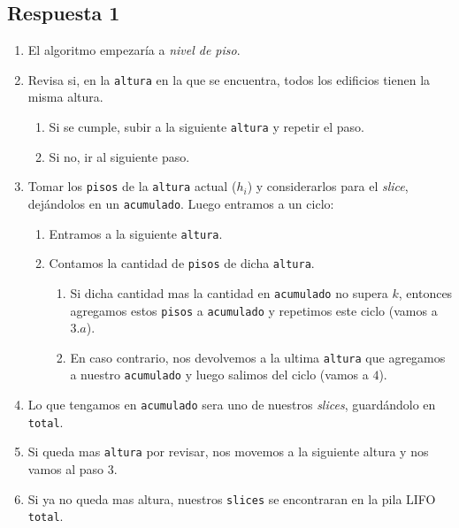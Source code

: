 \documentclass[spanish, fleqn]{article}
\begin{document}
\subsection{Respuesta 1}

\begin{enumerate}
    \item El algoritmo empezaría a \textit{nivel de piso}.
    
    \item Revisa si, en la \texttt{altura} en la que se encuentra, todos los edificios tienen la misma altura.
    
    \begin{enumerate}
        \item Si se cumple, subir a la siguiente \texttt{altura} y repetir el paso.
        
        \item Si no, ir al siguiente paso.
    \end{enumerate}
    
    \item Tomar los \texttt{pisos} de la \texttt{altura} actual (\texttt{$h_i$}) y considerarlos para el \textit{slice}, dejándolos en un \texttt{acumulado}. Luego entramos a un ciclo:
    
    \begin{enumerate}
        \item Entramos a la siguiente \texttt{altura}.
        
        \item Contamos la cantidad de \texttt{pisos} de dicha \texttt{altura}.
        
        \begin{enumerate}
            \item Si dicha cantidad mas la cantidad en \texttt{acumulado} no supera \texttt{$k$}, entonces agregamos estos \texttt{pisos} a \texttt{acumulado} y repetimos este ciclo (vamos a $3.a$).
            
            \item En caso contrario, nos devolvemos a la ultima \texttt{altura} que agregamos a nuestro \texttt{acumulado} y luego salimos del ciclo (vamos a $4$).
        \end{enumerate}
        
    \end{enumerate}
    
    \item Lo que tengamos en \texttt{acumulado} sera uno de nuestros \textit{slices}, guardándolo en \texttt{total}.
    
    \item Si queda mas \texttt{altura} por revisar, nos movemos a la siguiente altura y nos vamos al paso $3$.
    
    \item Si ya no queda mas altura, nuestros \texttt{slices} se encontraran en la pila LIFO \texttt{total}.
\end{enumerate}
\end{document}
